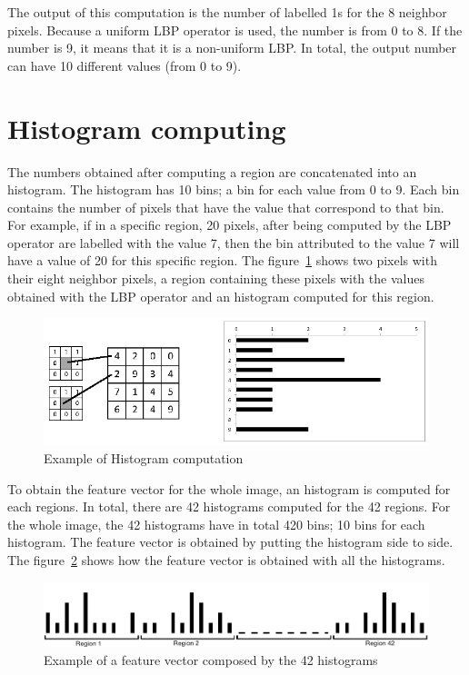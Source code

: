 \noindent The output of this computation is the number of labelled 1s for the 8 neighbor pixels. Because a uniform LBP operator is used, the number is from 0 to 8. If the number is 9, it means that it is a non-uniform LBP. In total, the output number can have 10 different values (from 0 to 9).
\newline

\section{Histogram computing}

\vspace{\baselineskip}
\noindent The numbers obtained after computing a region are concatenated into an histogram. The histogram has 10 bins; a bin for each value from 0 to 9. Each bin contains the number of pixels that have the value that correspond to that bin. For example, if in a specific region, 20 pixels, after being computed by the LBP operator are labelled with the value 7, then the bin attributed to the value 7 will have a value of 20 for this specific region. The figure~\ref{lbp_implementation_histogram} shows two pixels with their eight neighbor pixels, a region containing these pixels with the values obtained with the LBP operator and an histogram computed for this region.
\newline

\begin{figure}[!h]
\begin{center}
\noindent \includegraphics[scale=0.6]{figures/lbp_implementation_histogram} 
\newline
\caption{Example of Histogram computation}
\label{lbp_implementation_histogram}
\end{center} 
\end{figure}

\noindent To obtain the feature vector for the whole image, an histogram is computed for each regions. In total, there are 42 histograms computed for the 42 regions. For the whole image, the 42 histograms have in total 420 bins; 10 bins for each histogram. The feature vector is obtained by putting the histogram side to side. The figure~\ref{lbp_implementation_vector} shows how the feature vector is obtained with all the histograms.
\newline

\begin{figure}[!h]
\begin{center}
\noindent \includegraphics[scale=0.4]{figures/lbp_implementation_vector} 
\newline
\caption{Example of a feature vector composed by the 42 histograms}
\label{lbp_implementation_vector}
\end{center} 
\end{figure}


